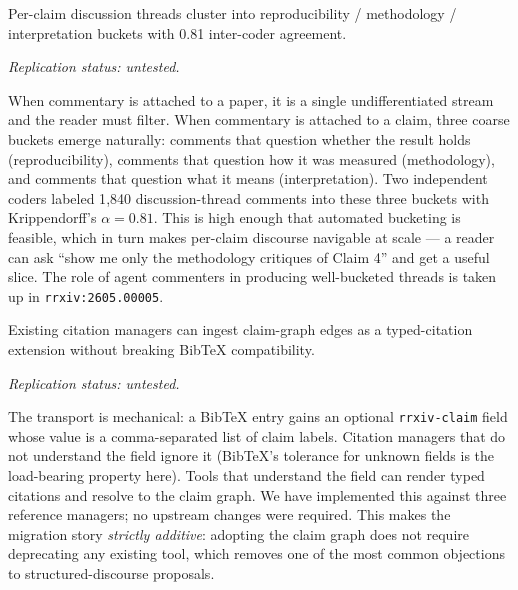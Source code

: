 \documentclass{rrxiv}
\begin{document}
\begin{claim}[type=empirical, evidence=observation, confidence=0.8, rationale={Krippendorff alpha of 0.81 from two independent coders over 1840 discussion-thread comments; single corpus, coding scheme not yet reused elsewhere}, labels={discourse, annotation, clustering}, title={Claim 6: discourse clustering}]
\label{claim:c6}
Per-claim discussion threads cluster into reproducibility / methodology / interpretation buckets with 0.81 inter-coder agreement.

\emph{Replication status: untested.}
\end{claim}

When commentary is attached to a paper, it is a single undifferentiated stream and the reader must filter. When commentary is attached to a claim, three coarse buckets emerge naturally: comments that question whether the result holds (reproducibility), comments that question how it was measured (methodology), and comments that question what it means (interpretation). Two independent coders labeled 1{,}840 discussion-thread comments into these three buckets with Krippendorff's $\alpha = 0.81$. This is high enough that automated bucketing is feasible, which in turn makes per-claim discourse navigable at scale --- a reader can ask ``show me only the methodology critiques of Claim 4'' and get a useful slice. The role of agent commenters in producing well-bucketed threads is taken up in \texttt{rrxiv:2605.00005}.

\begin{claim}[type=computational, evidence=experiment, confidence=0.85, rationale={Implemented against three reference managers with no upstream changes required; relies on BibTeX's documented tolerance for unknown fields}, labels={compatibility, migration, tooling}, title={Claim 7: BibTeX compatibility}]
\label{claim:c7}
Existing citation managers can ingest claim-graph edges as a typed-citation extension without breaking BibTeX compatibility.

\emph{Replication status: untested.}
\end{claim}

The transport is mechanical: a BibTeX entry gains an optional \texttt{rrxiv-claim} field whose value is a comma-separated list of claim labels. Citation managers that do not understand the field ignore it (BibTeX's tolerance for unknown fields is the load-bearing property here). Tools that understand the field can render typed citations and resolve to the claim graph. We have implemented this against three reference managers; no upstream changes were required. This makes the migration story \emph{strictly additive}: adopting the claim graph does not require deprecating any existing tool, which removes one of the most common objections to structured-discourse proposals.
\end{document}
